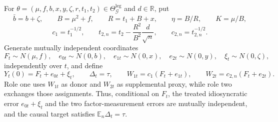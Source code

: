 For \(\theta=(\mu,f,b,x,y,\zeta,r,t_1,t_2)\in\Theta_{\mathcal G}^{\mathrm{leg}}\) and \(d\in\mathbb R\), put
\[
 \bar b=b+\zeta,\qquad B=\mu^2+f,\qquad
 R=t_1+B+x,\qquad \eta=B/R,\qquad K=\mu/B,
\]
\[
 c_1=t_1^{-1/2},\qquad
 t_{2,n}=t_2-\frac{R^2}{B^2}\frac d{\sqrt n},
 \qquad c_{2,n}=t_{2,n}^{-1/2}.
\]
Generate mutually independent coordinates
\[
 F_t\sim N(\mu,f),\quad e_{0t}\sim N(0,b),\quad
 e_{1t}\sim N(0,x),\quad e_{2t}\sim N(0,y),\quad
 \xi_t\sim N(0,\zeta),
\]
independently over \(t\), and define
\[
 Y_t(0)=F_t+e_{0t}+\xi_t,\qquad
 \Delta_t=\tau,\qquad
 W_{1t}=c_1(F_t+e_{1t}),\qquad
 W_{2t}=c_{2,n}(F_t+e_{2t}).
\]
Role one uses \(W_{1t}\) as donor and \(W_{2t}\) as supplemental proxy, while role two exchanges those assignments.  Thus, conditional on \(F_t\), the treated idiosyncratic error \(e_{0t}+\xi_t\) and the two factor-measurement errors are mutually independent, and the causal target satisfies \(\mathbb E_n\Delta_t=\tau\).

